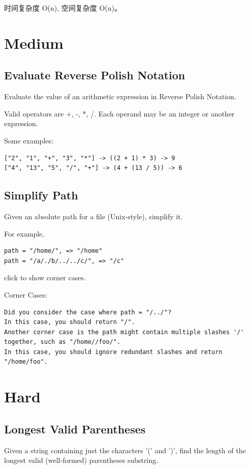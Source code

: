 \documentclass[12pt]{book}
\begin{document}
时间复杂度 O(n), 空间复杂度 O(n)。

\section{Medium}
\label{sec-5-2}
\subsection{Evaluate Reverse Polish Notation}
\label{sec-5-2-1}
Evaluate the value of an arithmetic expression in Reverse Polish Notation.

Valid operators are +, -, *, /. Each operand may be an integer or another expression.

Some examples:
\lstset{language=java,label= ,caption= ,numbers=none}
\begin{lstlisting}
["2", "1", "+", "3", "*"] -> ((2 + 1) * 3) -> 9
["4", "13", "5", "/", "+"] -> (4 + (13 / 5)) -> 6
\end{lstlisting}

\subsection{Simplify Path}
\label{sec-5-2-2}
Given an absolute path for a file (Unix-style), simplify it.

For example,
\lstset{language=java,label= ,caption= ,numbers=none}
\begin{lstlisting}
path = "/home/", => "/home"
path = "/a/./b/../../c/", => "/c"
\end{lstlisting}

click to show corner cases.

Corner Cases:
\lstset{language=java,label= ,caption= ,numbers=none}
\begin{lstlisting}
Did you consider the case where path = "/../"?
In this case, you should return "/".
Another corner case is the path might contain multiple slashes '/' together, such as "/home//foo/".
In this case, you should ignore redundant slashes and return "/home/foo".
\end{lstlisting}

\section{Hard}
\label{sec-5-3}
\subsection{Longest Valid Parentheses}
\label{sec-5-3-1}
Given a string containing just the characters '(' and ')', find the length of the longest valid (well-formed) parentheses substring.
\end{document}
